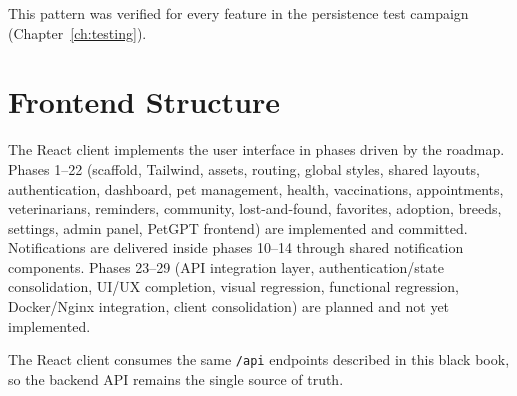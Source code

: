 This pattern was verified for every feature in the persistence test campaign
(Chapter~\ref{ch:testing}).

\section{Frontend Structure}

The React client implements the user interface in phases driven by the roadmap.
Phases 1--22 (scaffold, Tailwind, assets, routing,
global styles, shared layouts, authentication, dashboard, pet management,
health, vaccinations, appointments, veterinarians, reminders, community,
lost-and-found, favorites, adoption, breeds, settings, admin panel, PetGPT
frontend) are
implemented and committed. Notifications are delivered inside phases 10--14
through shared notification components. Phases 23--29 (API
integration layer, authentication/state consolidation, UI/UX completion,
visual regression, functional regression, Docker/Nginx integration, client
consolidation) are planned and not yet implemented.

The React client consumes the same \texttt{/api} endpoints described in
this black book, so the backend API remains the single source of truth.